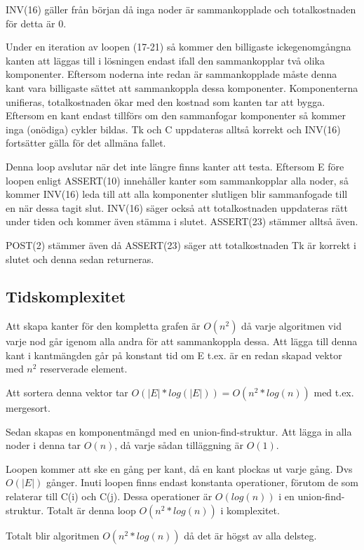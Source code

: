 \documentclass[a4paper,10pt,twoside]{article}
\begin{document}
INV(16) gäller från början då inga noder är sammankopplade och totalkostnaden för detta är 0.

Under en iteration av loopen (17-21) så kommer den billigaste ickegenomgångna kanten att läggas till i lösningen endast ifall den sammankopplar två olika komponenter. Eftersom noderna inte redan är sammankopplade måste denna kant vara billigaste sättet att sammankoppla dessa komponenter. Komponenterna unifieras, totalkostnaden ökar med den kostnad som kanten tar att bygga. Eftersom en kant endast tillförs om den sammanfogar komponenter så kommer inga (onödiga) cykler bildas. Tk och C uppdateras alltså korrekt och INV(16) fortsätter gälla för det allmäna fallet.

Denna loop avslutar när det inte längre finns kanter att testa. Eftersom E före loopen enligt ASSERT(10) innehåller kanter som sammankopplar alla noder, så kommer INV(16) leda till att alla komponenter slutligen blir sammanfogade till en när dessa tagit slut. INV(16) säger också att totalkostnaden uppdateras rätt under tiden och kommer även stämma i slutet. ASSERT(23) stämmer alltså även. 

POST(2) stämmer även då ASSERT(23) säger att totalkostnaden Tk är korrekt i slutet och denna sedan returneras.

\subsection{Tidskomplexitet}

Att skapa kanter för den kompletta grafen är $O(n^2)$ då varje algoritmen vid varje nod går igenom alla andra för att sammankoppla dessa. Att lägga till denna kant i kantmängden går på konstant tid om E t.ex. är en redan skapad vektor med $n^2$ reserverade element.

Att sortera denna vektor tar $O(|E|*log(|E|)) = O(n^2*log(n))$ med t.ex. mergesort.

Sedan skapas en komponentmängd med en union-find-struktur. Att lägga in alla noder i denna tar $O(n)$, då varje sådan tilläggning är $O(1)$.

Loopen kommer att ske en gång per kant, då en kant plockas ut varje gång. Dvs $O(|E|)$ gånger. Inuti loopen finns endast konstanta operationer, förutom de som relaterar till C(i) och C(j). Dessa operationer är $O(log(n))$ i en union-find-struktur. Totalt är denna loop $O(n^2*log(n))$ i komplexitet.

Totalt blir algoritmen $O(n^2*log(n))$ då det är högst av alla delsteg.
\end{document}

